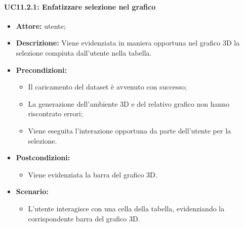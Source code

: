 \paragraph{UC11.2.1: Enfatizzare selezione nel grafico}
\begin{itemize}    
    \item \textbf{Attore:} utente;
    \item \textbf{Descrizione:} Viene evidenziata in maniera opportuna nel grafico 3D la selezione compiuta dall'utente nella tabella.
    \item \textbf{Precondizioni:}    
        \begin{itemize}
            \item Il caricamento del dataset è avvenuto con successo;
            \item La generazione dell'ambiente 3D e del relativo grafico non hanno riscontrato errori;
            \item Viene eseguita l'interazione opportuna da parte dell'utente per la selezione.
        \end{itemize}    
    \item \textbf{Postcondizioni:}
        \begin{itemize}
            \item Viene evidenziata la barra del grafico 3D.
        \end{itemize}    
    \item \textbf{Scenario:} 
        \begin{itemize}
            \item L'utente interagisce con una cella della tabella, evidenziando la corrispondente barra del grafico 3D.
        \end{itemize}
\end{itemize}
